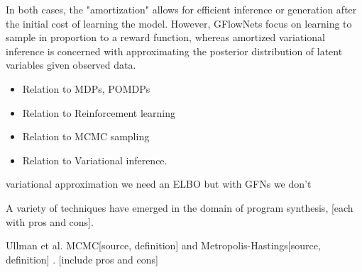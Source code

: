 In both cases, the "amortization" allows for efficient inference or generation after the initial cost of learning the model. However, GFlowNets focus on learning to sample in proportion to a reward function, whereas amortized variational inference is concerned with approximating the posterior distribution of latent variables given observed data.



\begin{itemize}
    \item Relation to MDPs, POMDPs
    \item Relation to Reinforcement learning
    \item Relation to MCMC sampling
    \item Relation to Variational inference. 
\end{itemize}


variational approximation we need an ELBO but with GFNs we don't 

A variety of techniques have emerged in the domain of program synthesis, [each with pros and cons].

Ullman et al. MCMC[source, definition] and Metropolis-Hastings[source, definition] \cite{ullman_theory_2012}. [include pros and cons]






